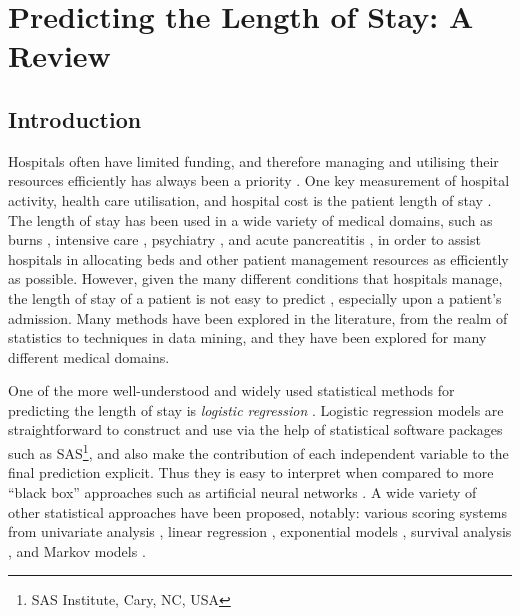 \chapter{Predicting the Length of Stay: A Review} \label{chap:litreview}

\section{Introduction}
Hospitals often have limited funding, and therefore managing and utilising
their resources efficiently has always been a priority \cite{Walczak2003}.
One key measurement of hospital activity, health care utilisation, and hospital
cost is the patient length of stay \citep{Omachonu2004,Ng2006}. The length of
stay has been used in a wide variety of medical domains, such as burns
 \citep{Yang2010}, intensive
care \citep{Tu1993,Harper2005,Perez2006,Dybowski1996},
psychiatry \citep{Lowell1997}, and acute pancreatitis \citep{Pofahl1998}, in
order to assist hospitals in allocating beds and other patient management
resources as efficiently as possible. However, given the many different
conditions that hospitals manage, the length of stay of a patient is
not easy to predict \citep{Walczak2003}, especially upon a patient's admission.
Many methods have been explored in the literature, from the realm of statistics
to techniques in data mining, and they have been explored for many different
medical domains.

One of the more well-understood and widely used statistical methods for
predicting the length of stay is \textit{logistic regression} \citep{Tu1996}.
Logistic regression models are straightforward to construct and use via the
help of statistical software packages such as
SAS\footnote{SAS Institute, Cary, NC, USA}, and
also make the contribution of each independent variable to the final
prediction explicit. Thus they is easy to interpret when compared to more
``black box'' approaches such as artificial neural networks \citep{Adams2012}.
A wide variety of other statistical approaches have been proposed, notably:
various scoring systems from univariate analysis \citep{Adams2012,Lavoie2005},
linear regression \citep{Yang2010}, exponential models \citep{Clark2007},
survival analysis \citep{Vasilakis2005}, and Markov
models \citep{Perez2006,Jain1989,Kapadia2000}.


